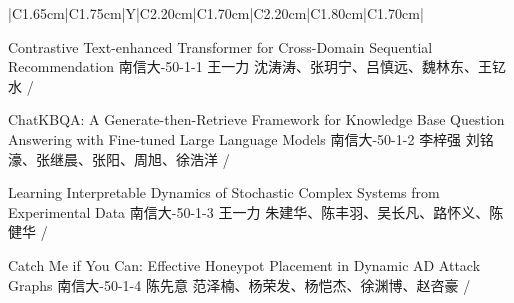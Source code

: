 \Needspace{7.5cm}
\begin{tabularx}{\textwidth}{|C{1.65cm}|C{1.75cm}|Y|C{2.20cm}|C{1.70cm}|C{2.20cm}|C{1.80cm}|C{1.70cm}|}
\HeaderRow

{Contrastive Text-enhanced Transformer for Cross-Domain Sequential Recommendation\newline }
{南信大-50-1-1}
{王一力}
{沈涛涛、张玥宁、吕慎远、魏林东、王钇水}
{}{/}

{ChatKBQA: A Generate-then-Retrieve Framework for Knowledge Base Question Answering with Fine-tuned Large Language Models\newline }
{南信大-50-1-2}
{李梓强}
{刘铭濠、张继晨、张阳、周旭、徐浩洋}
{}{/}


{Learning Interpretable Dynamics of Stochastic Complex Systems from Experimental Data\newline }
{南信大-50-1-3}
{王一力}
{朱建华、陈丰羽、吴长凡、路怀义、陈健华}
{}{/}

{Catch Me if You Can: Effective Honeypot Placement in Dynamic AD Attack Graphs \newline }
{南信大-50-1-4}
{陈先意}
{范泽楠、杨荣发、杨恺杰、徐渊博、赵咨豪}
{}{/}
\end{tabularx}
\BlockGap




